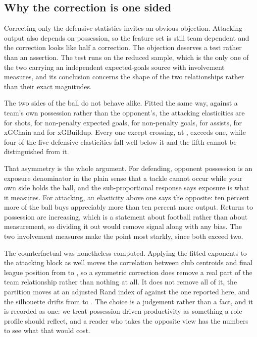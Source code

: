 

\subsection{Why the correction is one sided}
\label{sec:si:symmetric}

Correcting only the defensive statistics invites an obvious objection. Attacking output also
depends on possession, so the feature set is still team dependent and the correction looks like
half a correction. The objection deserves a test rather than an assertion. The test runs on the
reduced sample, which is the only one of the two carrying an independent expected-goals source
with involvement measures, and its conclusion concerns the shape of the two relationships rather
than their exact magnitudes.

The two sides of the ball do not behave alike. Fitted the same way, against a team's own
possession rather than the opponent's, the attacking elasticities are \BetaShots{} for shots,
\BetaNPXG{} for non-penalty expected goals, \BetaGoals{} for non-penalty goals, \BetaAssists{}
for assists, \BetaXGChain{} for xGChain and \BetaXGBuildup{} for xGBuildup. Every one except
crossing, at \BetaCrosses{}, exceeds one, while four of the five defensive elasticities fall
well below it and the fifth cannot be distinguished from it.

That asymmetry is the whole argument. For defending, opponent possession is an exposure
denominator in the plain sense that a tackle cannot occur while your own side holds the ball,
and the sub-proportional response says exposure is what it measures. For attacking, an
elasticity above one says the opposite: ten percent more of the ball buys appreciably more than
ten percent more output. Returns to possession are increasing, which is a statement about
football rather than about measurement, so dividing it out would remove signal along with any
bias. The two involvement measures make the point most starkly, since both exceed two.

The counterfactual was nonetheless computed. Applying the fitted exponents to the attacking
block as well moves the correlation between club centroids and final league position from
\SymCorrBaseline{} to \SymCorrAdjusted{}, so a symmetric correction does remove a real part of
the team relationship rather than nothing at all. It does not remove all of it, the partition
moves at an adjusted Rand index of \SymARI{} against the one reported here, and the silhouette
drifts from \SymSilhouetteBase{} to \SymSilhouetteAdj{}. The choice is a judgement rather than a
fact, and it is recorded as one: we treat possession driven productivity as something a role
profile should reflect, and a reader who takes the opposite view has the numbers to see what
that would cost.

